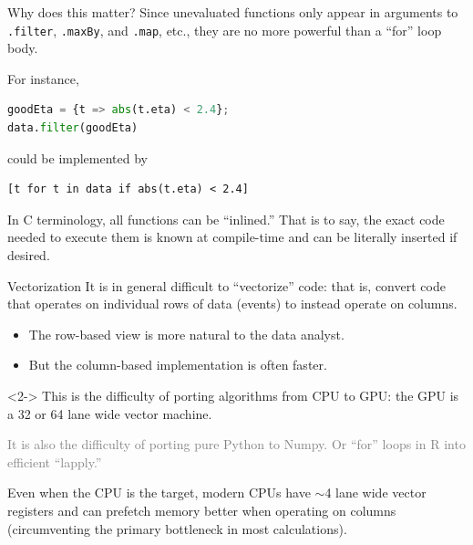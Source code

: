 \documentclass{beamer}
\begin{document}
\begin{frame}[fragile]{Why does this matter?}
\vspace{0.5 cm}
Since unevaluated functions only appear in arguments to {\tt .filter}, {\tt .maxBy}, and {\tt .map}, etc., they are no more powerful than a ``for'' loop body.

\vspace{0.25 cm}
For instance,
\begin{center}
\begin{minipage}{0.9\linewidth}
\small
\begin{lstlisting}[language=python]
goodEta = {t => abs(t.eta) < 2.4};
data.filter(goodEta)
\end{lstlisting}
\end{minipage}
\end{center}
could be implemented by
\begin{center}
\begin{minipage}{0.9\linewidth}
\small
\begin{verbatim}
[t for t in data if abs(t.eta) < 2.4]
\end{verbatim}
\end{minipage}
\end{center}
In C terminology, all functions can be ``inlined.'' That is to say, the exact code needed to execute them is known at compile-time and can be literally inserted if desired.
\end{frame}

\begin{frame}{Vectorization}
\vspace{0.5 cm}
It is in general difficult to ``vectorize'' code: that is, convert code that operates on individual rows of data (events) to instead operate on columns.
\begin{itemize}
\item The row-based view is more natural to the data analyst.
\item But the column-based implementation is often faster.
\end{itemize}

\vspace{0.5 cm}
\begin{uncoverenv}<2->
This is the difficulty of porting algorithms from CPU to GPU: the GPU is a 32 or 64 lane wide vector machine.

\vspace{0.2 cm}
\textcolor{gray}{It is also the difficulty of porting pure Python to Numpy. Or ``for'' loops in R into efficient ``lapply.''}

\vspace{0.5 cm}
Even when the CPU is the target, modern CPUs have $\sim$4 lane wide vector registers and can prefetch memory better when operating on columns (circumventing the primary bottleneck in most calculations).
\end{uncoverenv}
\end{frame}
\end{document}
